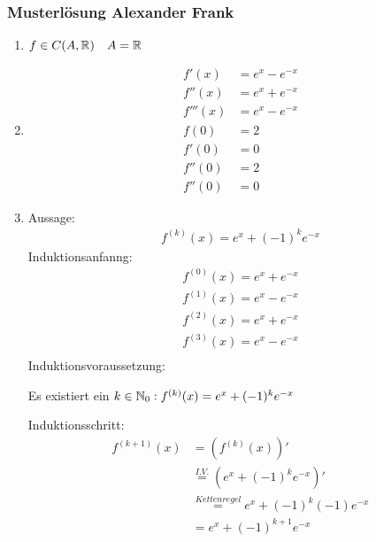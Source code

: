 \subsubsection{Musterlösung Alexander Frank}
\begin{enumerate}[label=Schritt \arabic*: ]
    \item $f \in C (A, \mathbb R) \quad A = \mathbb R$
    \item 
    \begin{align*}
        f'(x) &= e^x - e^{-x}\\
        f''(x) &= e^x + e^{-x}\\
        f'''(x) &= e^x - e^{-x}\\
        f(0) &= 2\\
        f'(0) &= 0\\
        f''(0) &= 2\\
        f''(0) &= 0
    \end{align*}
    \item 
    Aussage:
    \begin{align*}
        f^{(k)}(x) = e^x + (-1)^k e^{-x}
    \end{align*}
    Induktionsanfanng:\\
    \begin{align*}
        f^{(0)}(x) = e^x + e^{-x}\\
        f^{(1)}(x) = e^x - e^{-x}\\
        f^{(2)}(x) = e^x + e^{-x}\\
        f^{(3)}(x) = e^x - e^{-x}\\
    \end{align*}
    Induktionsvoraussetzung:\\
    \begin{center}
        Es existiert ein $k \in \mathbb N_0: f^{(k)}(x) = e^x + (-1)^k e^{-x}$
    \end{center}
    Induktionsschritt:\\
    \begin{align*}
        f^{(k+1)}(x) &= (f^{(k)}(x))'\\
        &\overset{I.V.}{=} (e^x + (-1)^k e^{-x})'\\
        &\overset{Kettenregel}{=} e^x + (-1)^k (-1) e^{-x}\\
        &= e^x + (-1)^{k+1} e^{-x}
    \end{align*}
    

\end{enumerate}
